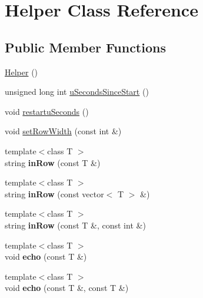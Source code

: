 \hypertarget{classHelper}{
\section{Helper Class Reference}
\label{classHelper}
}
\subsection*{Public Member Functions}
\begin{DoxyCompactItemize}
\item 
\hyperlink{classHelper_a59924530b7cfbc3d32134a1cf5de2a56}{Helper} ()
\item 
unsigned long int \hyperlink{classHelper_a58eb1df824ee417e918d7066120886f7}{uSecondsSinceStart} ()
\item 
void \hyperlink{classHelper_a0c44aeaa13ff3abb4ff9a33362c0c6c1}{restartuSeconds} ()
\item 
void \hyperlink{classHelper_a53b99bb6c9777901242656867ed67fff}{setRowWidth} (const int \&)
\item 
\hypertarget{classHelper_a4d1532e3e0135776f670467c3f60ed15}{
{\footnotesize template$<$class T $>$ }\\string {\bfseries inRow} (const T \&)}
\label{classHelper_a4d1532e3e0135776f670467c3f60ed15}

\item 
\hypertarget{classHelper_a0fb1a7f43802faea0332b5a527ad33f5}{
{\footnotesize template$<$class T $>$ }\\string {\bfseries inRow} (const vector$<$ T $>$ \&)}
\label{classHelper_a0fb1a7f43802faea0332b5a527ad33f5}

\item 
\hypertarget{classHelper_a179ca39d8f7f4141f573c2bbb90ad8aa}{
{\footnotesize template$<$class T $>$ }\\string {\bfseries inRow} (const T \&, const int \&)}
\label{classHelper_a179ca39d8f7f4141f573c2bbb90ad8aa}

\item 
\hypertarget{classHelper_aa494694186e5707b656faefeb328709f}{
{\footnotesize template$<$class T $>$ }\\void {\bfseries echo} (const T \&)}
\label{classHelper_aa494694186e5707b656faefeb328709f}

\item 
\hypertarget{classHelper_ab0e07920994169b035c0dadcfd02d581}{
{\footnotesize template$<$class T $>$ }\\void {\bfseries echo} (const T \&, const T \&)}
\label{classHelper_ab0e07920994169b035c0dadcfd02d581}


\end{DoxyCompactItemize}
